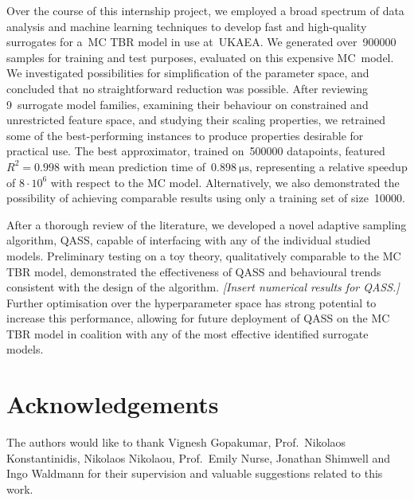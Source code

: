 Over the course of this internship project, we employed a broad spectrum of data
analysis and machine learning techniques to develop fast and high-quality
surrogates for a~MC TBR model in use at~UKAEA. We generated over~\num{900000}
samples for training and test purposes, evaluated on this expensive MC~model. We
investigated possibilities for simplification of the parameter space, and
concluded that no straightforward reduction was possible. After reviewing
9~surrogate model families, examining their behaviour on constrained and
unrestricted feature space, and studying their scaling properties, we retrained
some of the best-performing instances to produce properties desirable for
practical use. The best approximator, trained on~\num{500000} datapoints,
featured~$R^2=\num{0.998}$ with mean prediction time
of~$\SI{0.898}{\micro\second}$, representing a relative
speedup of $8\cdot 10^6$ with respect to the MC model. Alternatively, we
also demonstrated the possibility of achieving comparable results using only a
training set of size~\num{10000}.

After a thorough review of the literature, we developed a novel adaptive
sampling algorithm, QASS, capable of interfacing with any of the individual
studied models. Preliminary testing on a toy theory, qualitatively comparable to
the MC TBR model, demonstrated the effectiveness of QASS and behavioural trends
consistent with the design of the algorithm. \textit{[Insert numerical results
for QASS.]} Further optimisation over the hyperparameter space has strong
potential to increase this performance, allowing for future deployment of QASS
on the MC TBR model in coalition with any of the most effective identified
surrogate models.


\section*{Acknowledgements}

The authors would like to thank Vignesh Gopakumar, Prof.~Nikolaos
Konstantinidis, Nikolaos Nikolaou, Prof.~Emily Nurse, Jonathan Shimwell and Ingo
Waldmann for their supervision and valuable suggestions related to this work.

